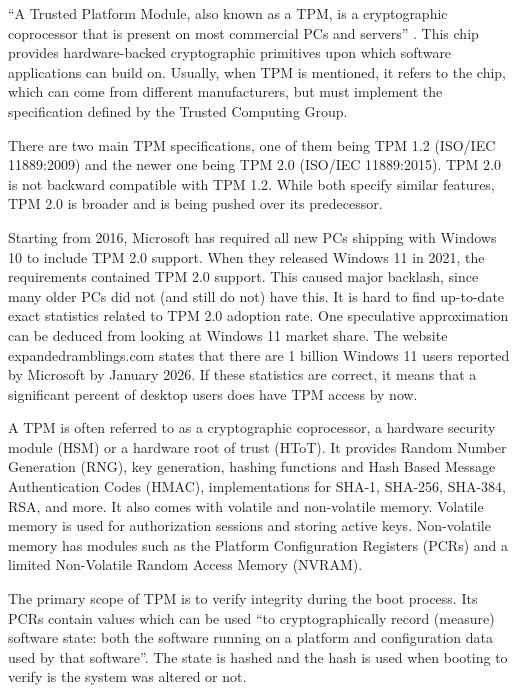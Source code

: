``A Trusted Platform Module, also known as a TPM, is a cryptographic coprocessor that is present on most commercial PCs and servers'' \cite{tpmbook}.
This chip provides hardware-backed cryptographic primitives upon which software applications can build on.
Usually, when TPM is mentioned, it refers to the chip, which can come from different manufacturers, but must implement the specification defined by the Trusted Computing Group.

There are two main TPM specifications, one of them being TPM 1.2 (ISO/IEC 11889:2009) and the newer one being TPM 2.0 (ISO/IEC 11889:2015)\cite{tpm-wiki}.
TPM 2.0 is not backward compatible with TPM 1.2.
While both specify similar features, TPM 2.0 is broader and is being pushed over its predecessor.

Starting from 2016, Microsoft has required all new PCs shipping with Windows 10 to include TPM 2.0 support.
When they released Windows 11 in 2021, the requirements contained TPM 2.0 support.
This caused major backlash, since many older PCs did not (and still do not) have this.
It is hard to find up-to-date exact statistics related to TPM 2.0 adoption rate.
One speculative approximation can be deduced from looking at Windows 11 market share.
The website expandedramblings.com states that there are 1 billion Windows 11 users reported by Microsoft by January 2026\cite{win11-adoption}.
If these statistics are correct, it means that a significant percent of desktop users does have TPM access by now. 

A TPM is often referred to as a cryptographic coprocessor, a hardware security module (HSM) or a hardware root of trust (HToT)\cite{tpmpdf}.
It provides Random Number Generation (RNG), key generation, hashing functions and Hash Based Message Authentication Codes (HMAC), implementations for SHA-1, SHA-256, SHA-384, RSA, and more.
It also comes with volatile and non-volatile memory.
Volatile memory is used for authorization sessions and storing active keys.
Non-volatile memory has modules such as the Platform Configuration Registers (PCRs) and a limited Non-Volatile Random Access Memory (NVRAM).

The primary scope of TPM is to verify integrity during the boot process.
Its PCRs contain values which can be used ``to cryptographically record (measure) software state: both the software running on a platform and configuration data used by that software''\cite{tpmbook}.
The state is hashed and the hash is used when booting to verify is the system was altered or not.

